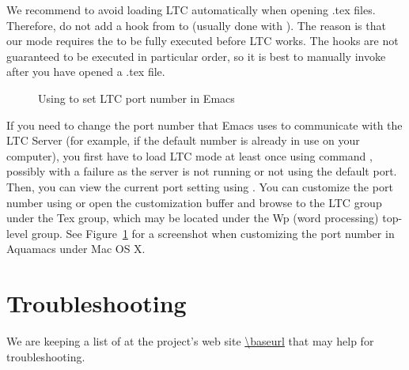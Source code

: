 We recommend to avoid loading LTC automatically when opening .tex files.  Therefore, do not add a hook from  to  (usually done with ).   The reason is that our mode requires the  to be fully executed before LTC works. The hooks are not guaranteed to be executed in particular order, so it is best to manually invoke  after you have opened a .tex file.

\begin{figure}[t]
\centering
{}
\caption[Setting LTC port number in Emacs]{Using  to set LTC port number in Emacs} \label{fig:emacs-port}
\end{figure}

If you need to change the port number that Emacs uses to communicate with the LTC Server (for example, if the default number is already in use on your computer), you first have to load LTC mode at least once using command , possibly with a failure as the server is not running or not using the default port.  Then, you can view the current port setting using .  You can customize the port number using  or open the customization buffer and browse to the LTC group under the Tex group, which may be located under the Wp (word processing) top-level group.  See Figure~\ref{fig:emacs-port} for a screenshot when customizing the port number in Aquamacs under Mac OS X.

%

\section{Troubleshooting}

We are keeping a list of  at the project's web site \url{\baseurl} that may help for troubleshooting.
